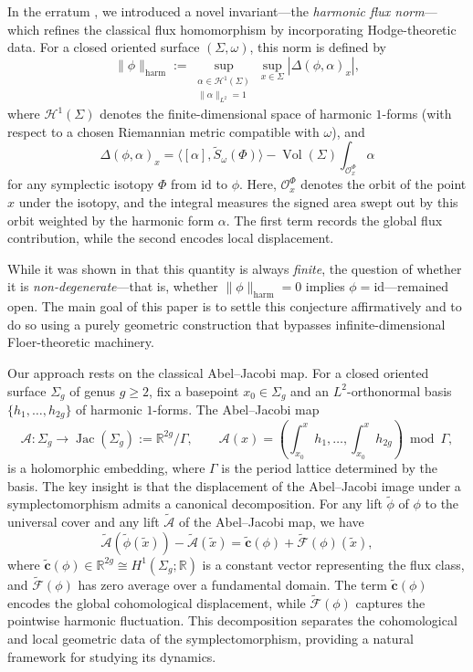 \documentclass[11pt]{article}
\theoremstyle{definition}
\begin{document}
	\medskip\noindent
	In the erratum \cite{Tchuaga2021Erratum}, we introduced a novel invariant---the \emph{harmonic flux norm}---which refines the classical flux homomorphism by incorporating Hodge-theoretic data. For a closed oriented surface $(\Sigma,\omega)$, this norm is defined by
	\[
	\|\phi\|_{\mathrm{harm}} := \sup_{\substack{\alpha\in\mathcal H^1(\Sigma)\\ \|\alpha\|_{L^2}=1}} \sup_{x\in \Sigma} |\Delta(\phi,\alpha)_x|,
	\]
	where $\mathcal H^1(\Sigma)$ denotes the finite-dimensional space of harmonic $1$-forms (with respect to a chosen Riemannian metric compatible with $\omega$), and
	\[
	\Delta(\phi,\alpha)_x = \langle [\alpha], \widetilde{S}_\omega(\Phi) \rangle - \operatorname{Vol}(\Sigma) \int_{\mathcal O_x^\Phi} \alpha
	\]
	for any symplectic isotopy $\Phi$ from $\mathrm{id}$ to $\phi$. Here, $\mathcal O_x^\Phi$ denotes the orbit of the point $x$ under the isotopy, and the integral measures the signed area swept out by this orbit weighted by the harmonic form $\alpha$. The first term records the global flux contribution, while the second encodes local displacement.
	
	While it was shown in \cite{Tchuaga2021Erratum} that this quantity is always \emph{finite}, the question of whether it is \emph{non-degenerate}---that is, whether $\|\phi\|_{\mathrm{harm}}=0$ implies $\phi=\mathrm{id}$---remained open. The main goal of this paper is to settle this conjecture affirmatively and to do so using a purely geometric construction that bypasses infinite-dimensional Floer-theoretic machinery.
	
	\medskip\noindent
	Our approach rests on the classical Abel--Jacobi map. For a closed oriented surface $\Sigma_g$ of genus $g\ge2$, fix a basepoint $x_0\in\Sigma_g$ and an $L^2$-orthonormal basis $\{h_1,\ldots,h_{2g}\}$ of harmonic $1$-forms. The Abel--Jacobi map
	\[
	\mathcal A:\Sigma_g \longrightarrow \operatorname{Jac}(\Sigma_g):=\mathbb R^{2g}/\Gamma,
	\qquad
	\mathcal A(x)=\left(\int_{x_0}^x h_1,\dots,\int_{x_0}^x h_{2g}\right)\bmod\Gamma,
	\]
	is a holomorphic embedding, where $\Gamma$ is the period lattice determined by the basis. The key insight is that the displacement of the Abel--Jacobi image under a symplectomorphism admits a canonical decomposition. For any lift $\widetilde\phi$ of $\phi$ to the universal cover and any lift $\widetilde{\mathcal A}$ of the Abel--Jacobi map, we have
	\[
	\widetilde{\mathcal A}(\widetilde\phi(\tilde x))-\widetilde{\mathcal A}(\tilde x)
	=
	\widetilde{\mathbf c}(\phi)+\widetilde{\mathcal F}(\phi)(\tilde x),
	\]
	where $\widetilde{\mathbf c}(\phi)\in\mathbb R^{2g}\cong H^1(\Sigma_g;\mathbb R)$ is a constant vector representing the flux class, and $\widetilde{\mathcal F}(\phi)$ has zero average over a fundamental domain. The term $\widetilde{\mathbf c}(\phi)$ encodes the global cohomological displacement, while $\widetilde{\mathcal F}(\phi)$ captures the pointwise harmonic fluctuation. This decomposition separates the cohomological and local geometric data of the symplectomorphism, providing a natural framework for studying its dynamics.
	
\end{document}
